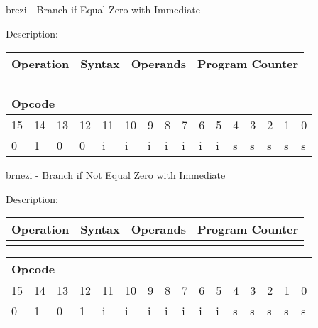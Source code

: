 \documentclass{article}
\begin{document}
\bigskip

brezi - Branch if Equal Zero with Immediate

Description:

\begin{tabular}{|l|l|l|l|}
\hline
Operation & Syntax & Operands & Program Counter \\ \hline
&  &  &  \\ \hline
\end{tabular}

\begin{tabular}{|c|c|c|c|c|c|c|c|c|c|c|c|c|c|c|c|}
\hline
\multicolumn{6}{|l|}{Opcode} & \multicolumn{5}{|l|}{} & \multicolumn{5}{|l|}{
} \\ \hline
15 & 14 & 13 & 12 & 11 & 10 & 9 & 8 & 7 & 6 & 5 & 4 & 3 & 2 & 1 & 0 \\ \hline
\multicolumn{1}{|l|}{0} & \multicolumn{1}{|l|}{1} & \multicolumn{1}{|l|}{0}
& \multicolumn{1}{|l|}{0} & \multicolumn{1}{|l|}{i} & \multicolumn{1}{|l|}{i}
& \multicolumn{1}{|l|}{i} & \multicolumn{1}{|l|}{i} & \multicolumn{1}{|l|}{i}
& \multicolumn{1}{|l|}{i} & \multicolumn{1}{|l|}{i} & \multicolumn{1}{|l|}{s}
& \multicolumn{1}{|l|}{s} & \multicolumn{1}{|l|}{s} & \multicolumn{1}{|l|}{s}
& \multicolumn{1}{|l|}{s} \\ \hline
\end{tabular}

\bigskip

brnezi - Branch if Not Equal Zero with Immediate

Description:

\begin{tabular}{|l|l|l|l|}
\hline
Operation & Syntax & Operands & Program Counter \\ \hline
&  &  &  \\ \hline
\end{tabular}

\begin{tabular}{|c|c|c|c|c|c|c|c|c|c|c|c|c|c|c|c|}
\hline
\multicolumn{6}{|l|}{Opcode} & \multicolumn{5}{|l|}{} & \multicolumn{5}{|l|}{
} \\ \hline
15 & 14 & 13 & 12 & 11 & 10 & 9 & 8 & 7 & 6 & 5 & 4 & 3 & 2 & 1 & 0 \\ \hline
\multicolumn{1}{|l|}{0} & \multicolumn{1}{|l|}{1} & \multicolumn{1}{|l|}{0}
& \multicolumn{1}{|l|}{1} & \multicolumn{1}{|l|}{i} & \multicolumn{1}{|l|}{i}
& \multicolumn{1}{|l|}{i} & \multicolumn{1}{|l|}{i} & \multicolumn{1}{|l|}{i}
& \multicolumn{1}{|l|}{i} & \multicolumn{1}{|l|}{i} & \multicolumn{1}{|l|}{s}
& \multicolumn{1}{|l|}{s} & \multicolumn{1}{|l|}{s} & \multicolumn{1}{|l|}{s}
& \multicolumn{1}{|l|}{s} \\ \hline
\end{tabular}
\end{document}
